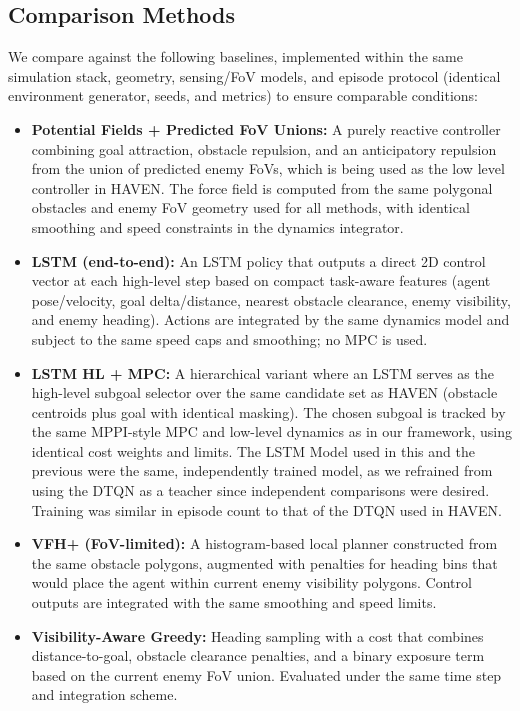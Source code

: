 \documentclass[letterpaper, 10 pt, conference]{ieeeconf}
\begin{document}
\subsection{Comparison Methods}

We compare against the following baselines, implemented within the same simulation stack, geometry, sensing/FoV models, and episode protocol (identical environment generator, seeds, and metrics) to ensure comparable conditions:
\begin{itemize}
    \item \textbf{Potential Fields + Predicted FoV Unions:} A purely reactive controller combining goal attraction, obstacle repulsion, and an anticipatory repulsion from the union of predicted enemy FoVs, which is being used as the low level controller in HAVEN. The force field is computed from the same polygonal obstacles and enemy FoV geometry used for all methods, with identical smoothing and speed constraints in the dynamics integrator.
    \item \textbf{LSTM (end-to-end):} An LSTM policy that outputs a direct 2D control vector at each high-level step based on compact task-aware features (agent pose/velocity, goal delta/distance, nearest obstacle clearance, enemy visibility, and enemy heading). Actions are integrated by the same dynamics model and subject to the same speed caps and smoothing; no MPC is used.
    \item \textbf{LSTM HL + MPC:} A hierarchical variant where an LSTM serves as the high-level subgoal selector over the same candidate set as HAVEN (obstacle centroids plus goal with identical masking). The chosen subgoal is tracked by the same MPPI-style MPC and low-level dynamics as in our framework, using identical cost weights and limits. The LSTM Model used in this and the previous were the same, independently trained model, as we refrained from using the DTQN as a teacher since independent comparisons were desired. Training was similar in episode count to that of the DTQN used in HAVEN.  
    \item \textbf{VFH+ (FoV-limited):} A histogram-based local planner constructed from the same obstacle polygons, augmented with penalties for heading bins that would place the agent within current enemy visibility polygons. Control outputs are integrated with the same smoothing and speed limits.
    \item \textbf{Visibility-Aware Greedy:} Heading sampling with a cost that combines distance-to-goal, obstacle clearance penalties, and a binary exposure term based on the current enemy FoV union. Evaluated under the same time step and integration scheme.

\end{itemize}
\end{document}
